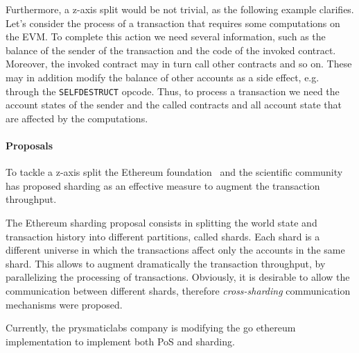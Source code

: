 Furthermore, a z-axis split would be not trivial, as the following example 
clarifies. Let's consider the process of a transaction that requires some 
computations on the EVM. To complete this action we need several information, 
such as the balance of the sender of the transaction and the code of the
invoked contract. Moreover, the invoked contract may in turn call other 
contracts and so on. These may in addition modify the balance of other accounts
as a side effect, e.g. through the \texttt{SELFDESTRUCT} opcode. Thus, to 
process a transaction we need the account states of the sender and the called
contracts and all account state that are affected by the computations.

\paragraph{Proposals} To tackle a z-axis split the Ethereum 
foundation~\cite{bib:mauve} and the scientific 
community~\cite{bib:scaling-croman} has proposed sharding as an effective 
measure to augment the transaction throughput.

The Ethereum sharding proposal consists in splitting the world state and
transaction history into different partitions, called shards. 
Each shard is a different universe in which the transactions affect only the 
accounts in the same shard. This allows to augment dramatically the transaction
throughput, by parallelizing the processing of transactions.
Obviously, it is desirable to allow the communication between different shards,
therefore \emph{cross-sharding} communication mechanisms were proposed.

Currently, the prysmaticlabs company is modifying the go ethereum implementation
to implement both PoS and sharding.




